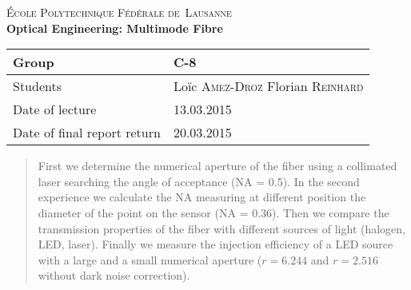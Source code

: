 \begin{titlepage}
\begin{center}
    \textsc{\LARGE École Polytechnique Fédérale de~Lausanne}\\[1.5cm] 
    {\huge \bfseries Optical Engineering: Multimode Fibre}\\[0.4cm] 
    \begin{tabular}{|p{5cm}|p{4cm}|}
        \hline
        Group & C-8 \\ \hline
        Students & Loïc \textsc{Amez-Droz} \newline Florian \textsc{Reinhard} \\ \hline
        Date of lecture & 13.03.2015 \\ \hline
        Date of final report return & 20.03.2015 \\ \hline
    \end{tabular}
\end{center}


\begin{abstract}
First we determine the numerical aperture of the fiber using a collimated laser searching the angle of acceptance (NA = 0.5).
In the second experience we calculate the NA measuring at different position the diameter of the point on the sensor (NA = 0.36).
Then we compare the transmission properties of the fiber with different sources of light (halogen, LED, laser).
Finally we measure the injection efficiency of a LED source with a large and a small numerical aperture ($r = 6.244$ and  $r = 2.516$ without dark noise correction).
\end{abstract}
 
\vfill
\end{titlepage}
